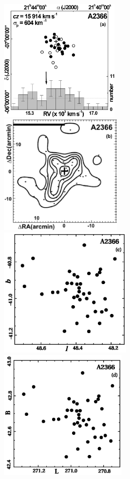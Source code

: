 \begin{figure}[H]
\centering
   \includegraphics[height=6.1cm]{fig7a.eps}
   \includegraphics[height=6.0cm]{fig7b.eps}\\
    \includegraphics[height=6.5cm]{gal_a2366.eps}
   \includegraphics[height=6.5cm]{sup_a2366.eps}

\end{figure}
